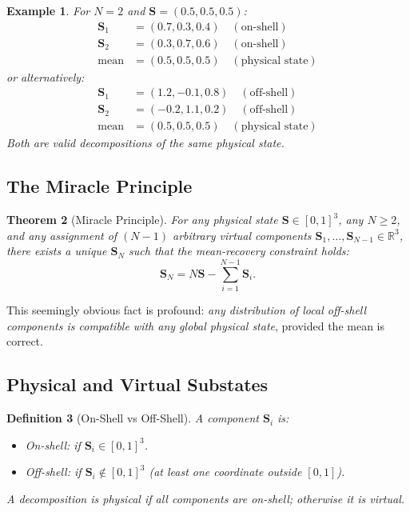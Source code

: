\documentclass[twocolumn,11pt,a4paper]{article}
\newtheorem{theorem}{Theorem}[section]
\newtheorem{definition}[theorem]{Definition}
\newtheorem{example}[theorem]{Example}
\newcommand{\Stuple}{\mathbf{S}}
\begin{document}
\begin{example}
For $N=2$ and $\Stuple = (0.5, 0.5, 0.5)$:
\begin{align}
\Stuple_1 &= (0.7, 0.3, 0.4) \quad (\text{on-shell})\\
\Stuple_2 &= (0.3, 0.7, 0.6) \quad (\text{on-shell})\\
\text{mean} &= (0.5, 0.5, 0.5) \quad (\text{physical state})
\end{align}
or alternatively:
\begin{align}
\Stuple_1 &= (1.2, -0.1, 0.8) \quad (\text{off-shell})\\
\Stuple_2 &= (-0.2, 1.1, 0.2) \quad (\text{off-shell})\\
\text{mean} &= (0.5, 0.5, 0.5) \quad (\text{physical state})
\end{align}
Both are valid decompositions of the same physical state.
\end{example}

\subsection{The Miracle Principle}

\begin{theorem}[Miracle Principle]
For any physical state $\Stuple \in [0,1]^3$, any $N \geq 2$, and any assignment of $(N-1)$ arbitrary virtual components $\Stuple_1, \ldots, \Stuple_{N-1} \in \mathbb{R}^3$, there exists a unique $\Stuple_N$ such that the mean-recovery constraint holds:
\begin{equation}
  \Stuple_N = N\Stuple - \sum_{i=1}^{N-1} \Stuple_i.
\end{equation}
\end{theorem}

This seemingly obvious fact is profound: \emph{any distribution of local off-shell components is compatible with any global physical state}, provided the mean is correct.

\subsection{Physical and Virtual Substates}

\begin{definition}[On-Shell vs Off-Shell]
A component $\Stuple_i$ is:
\begin{itemize}[nosep,leftmargin=1em]
  \item \emph{On-shell}: if $\Stuple_i \in [0,1]^3$.
  \item \emph{Off-shell}: if $\Stuple_i \notin [0,1]^3$ (at least one coordinate outside $[0,1]$).
\end{itemize}
A decomposition is \emph{physical} if all components are on-shell; otherwise it is \emph{virtual}.
\end{definition}
\end{document}
